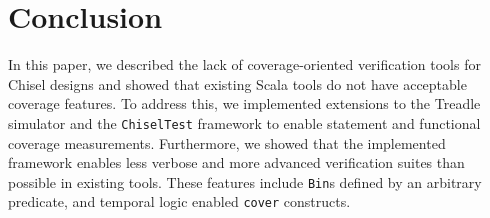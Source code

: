 \documentclass[conference]{IEEEtran}
\newcommand{\andrew}[1]{{\color{red} Andrew: #1}}
\newcommand{\hjd}[1]{{\color{pink} Hans: #1}}
\begin{document}
\section{Conclusion}

In this paper, we described the lack of coverage-oriented verification tools 
for Chisel designs and showed that existing Scala tools do not have acceptable coverage features. To 
address this, we implemented extensions to the Treadle simulator and the \texttt{ChiselTest} framework 
to enable statement and functional coverage measurements. Furthermore, we showed that the implemented 
framework enables less verbose and more advanced verification suites than possible in existing tools. 
These features include \texttt{Bin}s defined by an arbitrary predicate, and temporal logic enabled \texttt{cover} constructs. 
\end{document}
